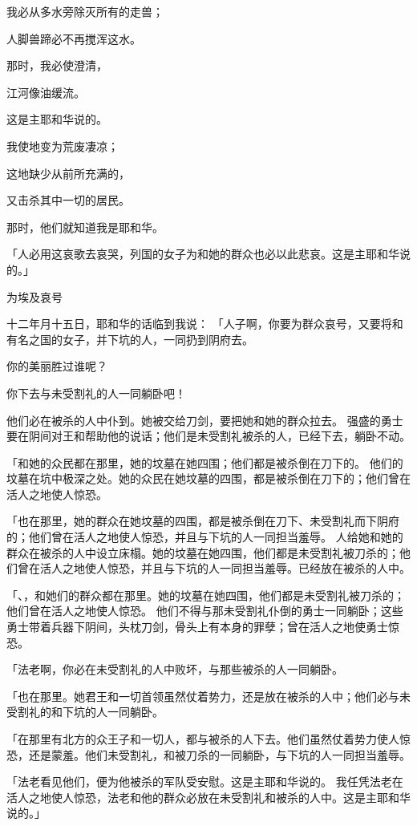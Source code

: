 {\par }{\Q {}我必从{}多水旁除灭所有的走兽；
\par }{\Q 人脚兽蹄必不再搅浑这水。
\par }{\Q {}那时，我必使{}澄清，
\par }{\Q 江河像油缓流。
\par }{\Q 这是主耶和华说的。
\par }{\Q {}我使{}地变为荒废凄凉；
\par }{\Q 这地缺少从前所充满的，
\par }{\Q 又击杀其中一切的居民。
\par }{\Q 那时，他们就知道我是耶和华。
\par }{\PP {}「人必用这哀歌去哀哭，列国的女子为{}和她的群众也必以此悲哀。这是主耶和华说的。」
\par }{\SH 为埃及哀号
\par }{\PP {}十二年{}月十五日，耶和华的话临到我说：
「人子啊，你要为{}群众哀号，又要将{}和有名之国的女子，并下坑的人，一同扔到阴府去。
\par }{\Q {}你{}的美丽胜过谁呢？
\par }{\Q 你下去与未受割礼的人一同躺卧吧！
\par }{\PP {}他们必在被杀的人中仆到。她被交给刀剑，要把她和她的群众拉去。
强盛的勇士要在阴间对{}王和帮助他的说话；他们是未受割礼被杀的人，已经下去，躺卧不动。
\par }{\PP {}「{}和她的众民都在那里，她{}的坟墓在她四围；他们都是被杀倒在刀下的。
他们的坟墓在坑中极深之处。她的众民在她坟墓的四围，都是被杀倒在刀下的；他们曾在活人之地使人惊恐。
\par }{\PP {}「{}也在那里，她的群众在她坟墓的四围，都是被杀倒在刀下、未受割礼而下阴府的；他们曾在活人之地使人惊恐，并且与下坑的人一同担当羞辱。
人给她和她的群众在被杀的人中设立床榻。她{}的坟墓在她四围，他们都是未受割礼被刀杀的；他们曾在活人之地使人惊恐，并且与下坑的人一同担当羞辱。{}已经放在被杀的人中。
\par }{\PP {}「{}、{}，和她们的群众都在那里。她{}的坟墓在她四围，他们都是未受割礼被刀杀的；他们曾在活人之地使人惊恐。
他们不得与那未受割礼仆倒的勇士一同躺卧；这些勇士带着兵器下阴间，头枕刀剑，骨头上有本身的罪孽；{}曾在活人之地使勇士惊恐。
\par }{\PP {}「法老啊，你必在未受割礼的人中败坏，与那些被杀的人一同躺卧。
\par }{\PP {}「{}也在那里。她君王和一切首领虽然仗着势力，还是放在被杀的人中；他们必与未受割礼的和下坑的人一同躺卧。
\par }{\PP {}「在那里有北方的众王子和一切{}人，都与被杀的人下去。他们虽然仗着势力使人惊恐，还是蒙羞。他们未受割礼，和被刀杀的一同躺卧，与下坑的人一同担当羞辱。
\par }{\PP {}「法老看见他们，便为他被杀的军队受安慰。这是主耶和华说的。
我任凭法老在活人之地使人惊恐，法老和他的群众必放在未受割礼和被杀的人中。这是主耶和华说的。」

}
